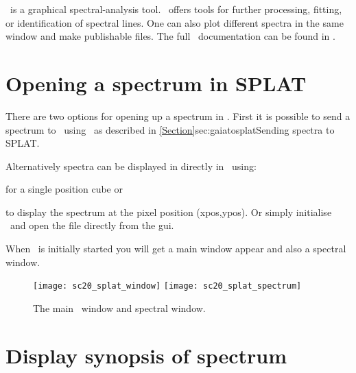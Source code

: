 \documentclass[11pt,oneside,chapters]{starlink}
\providecommand{\splatsun}{\xref{\textbf{SUN/243}}{sun243}{}}
\begin{document}
\splat\ is a graphical spectral-analysis tool. \splat\ offers tools for
further processing, fitting, or identification of spectral lines.
One can also plot different spectra in the same window and
make publishable files. The full \splat\ documentation can be found
in \splatsun.

\section{Opening a spectrum in SPLAT}
\label{sec:splat-open}

There are two options for opening up a spectrum in \splat. First it is
possible to send a spectrum to \splat\ using \gaia\ as described in
\cref{Section}{sec:gaiatosplat}{Sending spectra to SPLAT}.

Alternatively spectra can be displayed in directly in \splat\ using:

\begin{terminalv}
\end{terminalv}

for a single position cube or

\begin{terminalv}
\end{terminalv}

to display the spectrum at the pixel position (xpos,ypos). Or simply
initialise \splat\ and open the file directly from the gui.

\begin{terminalv}
\end{terminalv}

When \splat\ is initially started you will get a main window appear
and also a spectral window.

\begin{figure}[h!]
\begin{center}
\texttt{[image: sc20\_splat\_window]}
\texttt{[image: sc20\_splat\_spectrum]}
\caption[The main \splat\ window and spectrum window.]{\label{fig:splat_window}
  The main \splat\ window and spectral window.}
\end{center}
\end{figure}

\section{Display synopsis of spectrum}
\label{sec:splat-synopsis}
\end{document}
